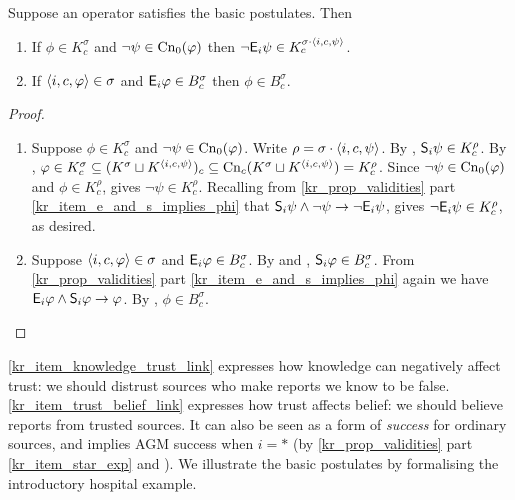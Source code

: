 \begin{proposition}
    \label{kr_prop_basic_postulates_consequences}
    Suppose an operator satisfies the basic postulates. Then
    \begin{enumerate}
        \item \label{kr_item_knowledge_trust_link} If $\phi \in K^\sigma_c$ and
              $\neg\psi \in \cnprop(\phi)$ then $\neg \E_i\psi \in K^{\sigma
              \concat \tuple{i, c, \psi}}_c$.
        \item \label{kr_item_trust_belief_link} If $\tuple{i, c, \phi} \in
              \sigma$ and $\E_i\phi \in B^\sigma_c$ then $\phi \in
              B^\sigma_c$.
    \end{enumerate}
\end{proposition}

\begin{proof}\leavevmode
    \begin{enumerate}

        \item Suppose $\phi \in K^\sigma_c$ and $\neg\psi \in \cnprop(\phi)$.
              Write $\rho = \sigma \concat \tuple{i, c, \psi}$. By
              \soundness{}, $\S_i\psi \in K^\rho_c$. By \kconj{}, $\phi \in
              K^\sigma_c \subseteq (K^\sigma \sqcup K^{\tuple{i, c, \psi}})_c
              \subseteq \cn_c(K^\sigma \sqcup K^{\tuple{i, c, \psi}}) =
              K^\rho_c$. Since $\neg\psi \in \cnprop(\phi)$ and $\phi \in
              K^\rho_c$, \closure{} gives $\neg\psi \in K^\rho_c$. Recalling
              from \cref{kr_prop_validities} part
              \cref{kr_item_e_and_s_implies_phi} that $\S_i\psi \land \neg
              \psi \limplies \neg \E_i\psi$, \closure{} gives $\neg
              \E_i\psi \in K^\rho_c$, as desired.

          \item Suppose $\tuple{i, c, \phi} \in \sigma$ and $\E_i\phi \in
                B^\sigma_c$. By \soundness{} and \containment{}, $\S_i\phi \in
                B^\sigma_c$. From \cref{kr_prop_validities} part
                \cref{kr_item_e_and_s_implies_phi} again we have $\E_i\phi
                \land \S_i\phi \limplies \phi$. By \closure{}, $\phi \in
                B^\sigma_c$.

    \end{enumerate}
\end{proof}

\cref{kr_item_knowledge_trust_link} expresses how knowledge can negatively
affect trust: we should distrust sources who make reports we know to be false.
\cref{kr_item_trust_belief_link} expresses how trust affects belief: we
should believe reports from trusted sources.
It can also be seen as a form of \emph{success} for ordinary sources, and
implies AGM success when $i = \ast$ (by \cref{kr_prop_validities} part
\cref{kr_item_star_exp} and \closure{}). We illustrate the basic postulates
by formalising the introductory hospital example.

